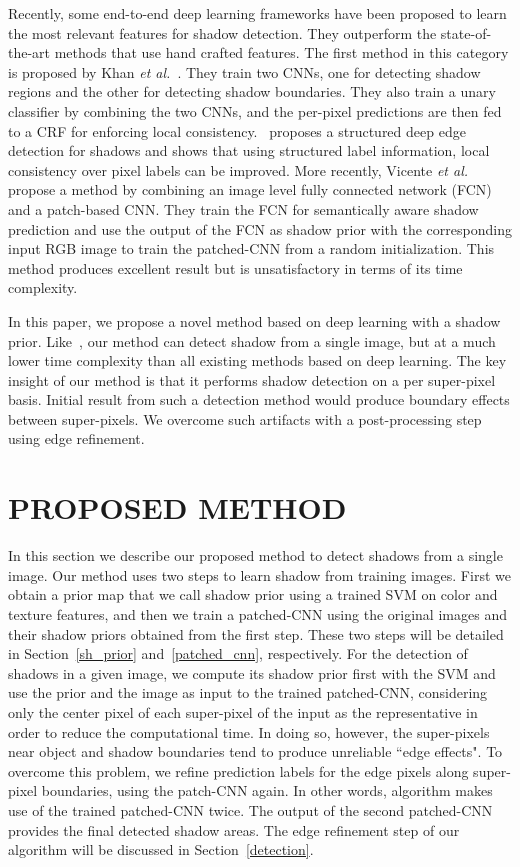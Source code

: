 \documentclass[letterpaper, 10 pt, conference]{ieeeconf}
\begin{document}
Recently, some end-to-end deep learning frameworks have been proposed to learn the most relevant features for shadow detection. They outperform the state-of-the-art methods that use hand crafted features. The first method in this category is proposed by Khan {\it{et al.}}~\cite{Khan, Khan2}. They train two CNNs, one for detecting shadow regions and the other for detecting shadow boundaries. They also train a unary classifier by combining the two CNNs, and the per-pixel predictions are then fed to a CRF for enforcing local consistency.~\cite{Shen} proposes a structured deep edge detection for shadows and shows that using structured label information, local consistency over pixel labels can be improved. More recently, Vicente {\it{et al.}}~\cite{Vicente2} propose a method by combining an image level fully connected network (FCN) and a patch-based CNN. They train the FCN for semantically aware shadow prediction and use the output of the FCN as shadow prior with the corresponding input RGB image to train the patched-CNN from a random initialization. This method produces excellent result but is unsatisfactory in terms of its time complexity.

In this paper, we propose a novel method based on deep learning with a shadow prior. Like~\cite{Shen}, our method can detect shadow from a single image, but at a much lower time complexity than all existing methods based on deep learning.  The key insight of our method is that it performs shadow detection on a per super-pixel basis. Initial result from such a detection method would produce boundary effects between super-pixels.  We overcome such artifacts with a post-processing step using edge refinement. 







\section{PROPOSED METHOD}
\label{proposed}
In this section we describe our proposed method to detect shadows from a single image. Our method uses two steps to learn shadow from training images. First we obtain a prior map that we call shadow prior using a trained SVM on color and texture features, and then we train a patched-CNN using the original images and their shadow priors obtained from the first step. These two steps will be detailed in Section~\ref{sh_prior} and~\ref{patched_cnn}, respectively. For the detection of shadows in a given image, we compute its shadow prior  first with the SVM and use the prior and the image as input to the trained patched-CNN, considering only the center pixel of each super-pixel of the input as the representative in order to reduce the computational time. In doing so, however, the super-pixels near object and shadow boundaries tend to produce unreliable ``edge effects". To overcome this problem, we refine prediction labels for the edge pixels along super-pixel boundaries, using the patch-CNN again. In other words, algorithm makes use of the trained patched-CNN twice. The output of the second patched-CNN provides the final detected shadow areas. The edge refinement step of our algorithm will be discussed in Section~\ref{detection}. 
\end{document}
